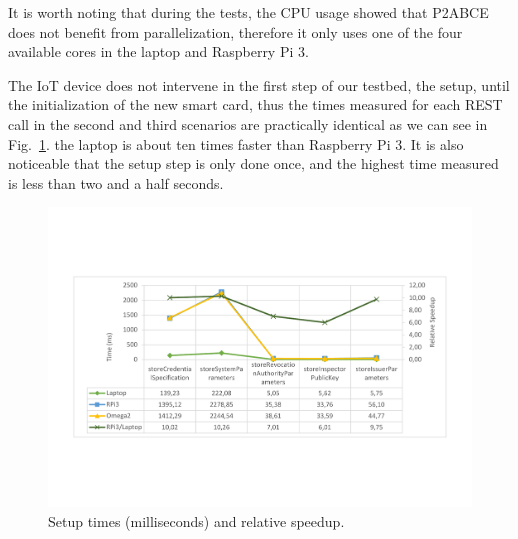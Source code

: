 It is worth noting that during the tests, the CPU usage showed that P2ABCE does not benefit from parallelization, therefore it only uses one of the four available cores in the laptop and Raspberry Pi 3.

\hfil

The IoT device does not intervene in the first step of our testbed, the setup, until the initialization of the new smart card, thus the times measured for each REST call in the second and third scenarios are practically identical as we can see in Fig.~\ref{fig:setup:graph}. the laptop is about ten times faster than Raspberry Pi 3. It is also noticeable that the setup step is only done once, and the highest time measured is less than two and a half seconds.

\begin{figure}[bth]
	\includegraphics[width=\linewidth]{gfx/graphics/SetupGraphTable}
	\caption{Setup times (milliseconds) and relative speedup.}
	\label{fig:setup:graph}
\end{figure}




\hfil

